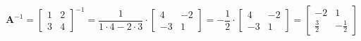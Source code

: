 \documentclass[
]{book}
\theoremstyle{definition}
\theoremstyle{definition}
\theoremstyle{definition}
\theoremstyle{remark}
\begin{document}
\[\mathbf{A}^{-1} = \begin{bmatrix}
  1 & 2   \\
  3 & 4 
\end{bmatrix}^{-1} = \frac{1}{1 \cdot 4 - 2 \cdot 3} \cdot \begin{bmatrix}
  4 & -2   \\
  -3 & 1
\end{bmatrix} = -\frac{1}{2} \cdot \begin{bmatrix}
  4 & -2   \\
  -3 & 1
\end{bmatrix} = \begin{bmatrix}
  -2 & 1   \\
  \frac{3}{2} & -\frac{1}{2}
\end{bmatrix}\]
\end{document}
